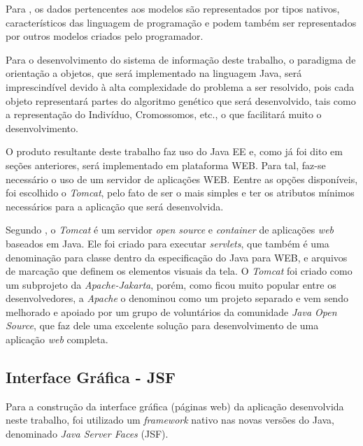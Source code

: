 \par Para , 
os dados pertencentes aos modelos são representados por tipos nativos,
característicos das linguagem de programação e podem também ser representados
por outros modelos criados pelo programador.

\par Para o desenvolvimento do sistema de informação deste trabalho, o paradigma
de orientação a objetos, que será implementado na linguagem Java, será
imprescindível devido à alta complexidade do problema a ser resolvido, 
pois cada objeto representará partes do algoritmo genético que será desenvolvido, tais
como a representação do Indivíduo, Cromossomos, etc., o que facilitará muito o
desenvolvimento.

\par O produto resultante deste trabalho faz uso do Java EE e, como já foi dito
em seções anteriores, será implementado em plataforma WEB. Para tal, faz-se
necessário o uso de um servidor de aplicações WEB. Eentre as opções disponíveis, 
foi escolhido o \textit{Tomcat}, pelo fato de ser o mais simples e ter os atributos 
mínimos necessários para a aplicação que será desenvolvida.

\par Segundo , o \textit{Tomcat} é um
servidor \textit{open source} e \textit{container} de aplicações \textit{web}
baseados em Java. Ele foi criado para executar \textit{servlets}, que também é
uma denominação para classe dentro da especificação do Java para WEB, e arquivos
de marcação que definem os elementos visuais da tela.
O \textit{Tomcat} foi criado como um subprojeto da \textit{Apache-Jakarta}, porém,
como ficou muito popular entre os desenvolvedores, a \textit{Apache} o denominou como um
projeto separado e vem sendo melhorado e apoiado por um grupo de voluntários da comunidade 
\textit{Java Open Source}, que faz dele uma excelente solução para desenvolvimento de uma 
aplicação \textit{web} completa. 

 

\subsection{Interface Gráfica - JSF}


\par Para a construção da interface gráfica (páginas web) da aplicação
desenvolvida neste trabalho, foi utilizado um \textit{framework} nativo nas
novas versões do Java, denominado \textit{Java Server Faces} (JSF).

